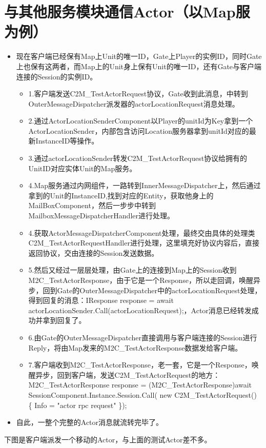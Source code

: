 \documentclass[9pt, b5paper]{article}
\begin{document}
\section{与其他服务模块通信Actor（以Map服为例）}
\label{sec-9}
\begin{itemize}
\item 现在客户端已经保有Map上Unit的唯一ID，Gate上Player的实例ID，同时Gate上也保有这两者，而Map上的Unit身上保有Unit的唯一ID，还有Gate与客户端连接的Session的实例ID。
\begin{itemize}
\item 1.客户端发送C2M\_TestActorRequest协议，Gate收到此消息，中转到OuterMessageDispatcher派发器的actorLocationRequest消息处理。
\item 2.通过ActorLocationSenderComponent以Player的unitId为Key拿到一个ActorLocationSender，内部包含访问Location服务器拿到unitId对应的最新InstanceID等操作。
\item 3.通过actorLocationSender转发C2M\_TestActorRequest协议给拥有的UnitID对应实体Unit的Map服务。
\item 4.Map服务通过内网组件，一路转到InnerMessageDispatcher上，然后通过拿到的Unit的InstanceID,找到对应的Entity，获取他身上的MailBoxComponent，然后一步步中转到MailboxMessageDispatcherHandler进行处理。
\item 4.获取ActorMessageDispatcherComponent处理，最终交由具体的处理类C2M\_TestActorRequestHandler进行处理，这里填充好协议内容后，直接返回协议，交由连接的Session发送数据。
\item 5.然后又经过一层层处理，由Gate上的连接到Map上的Session收到M2C\_TestActorResponse，由于它是一个Response，所以走回调，唤醒异步，回到Gate的OuterMessageDispatcher中的actorLocationRequest处理，得到回复的消息：IResponse response = await actorLocationSender.Call(actorLocationRequest);，Actor消息已经转发成功并拿到回复了。
\item 6.由Gate的OuterMessageDispatcher直接调用与客户端连接的Session进行Reply，将由Map发来的M2C\_TestActorResponse数据发给客户端。
\item 7.客户端收到M2C\_TestActorResponse，老一套，它是一个Response，唤醒异步，回到客户端，发送C2M\_TestActorRequest的地方：M2C\_TestActorResponse response = (M2C\_TestActorResponse)await SessionComponent.Instance.Session.Call( new C2M\_TestActorRequest() \{ Info = "actor rpc request" \});
\end{itemize}
\item 自此，一整个完整的Actor消息就流转完毕了。
\end{itemize}
下图是客户端派发一个移动的Actor，与上面的测试Actor差不多。
\end{document}

